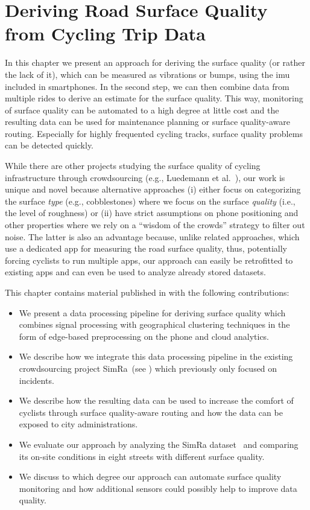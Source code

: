 \chapter{Deriving Road Surface Quality from Cycling Trip Data}
\label{cha:cyclequality}
In this chapter we present an approach for deriving the surface quality (or rather the lack of it), which can be measured as vibrations or bumps, using the \ac{imu} included in smartphones.
In the second step, we can then combine data from multiple rides to derive an estimate for the surface quality.
This way, monitoring of surface quality can be automated to a high degree at little cost and the resulting data can be used for maintenance planning or surface quality-aware routing.
Especially for highly frequented cycling tracks, surface quality problems can be detected quickly.

While there are other projects studying the surface quality of cycling infrastructure through crowdsourcing (e.g., Luedemann et al.~\cite{luedemann2022bikevibes}), our work is unique and novel because alternative approaches (i) either focus on categorizing the surface \emph{type} (e.g., cobblestones) where we focus on the surface \emph{quality} (i.e., the level of roughness) or (ii) have strict assumptions on phone positioning and other properties where we rely on a ``wisdom of the crowds'' strategy to filter out noise.
The latter is also an advantage because, unlike related approaches, which use a dedicated app for measuring the road surface quality, thus, potentially forcing cyclists to run multiple apps, our approach can easily be retrofitted to existing apps and can even be used to analyze already stored datasets.

This chapter contains material published in \cite{karakaya2023crowdsensing} with the following contributions:
\begin{itemize}
	\item We present a data processing pipeline for deriving surface quality which combines signal processing with geographical clustering techniques in the form of edge-based preprocessing on the phone and cloud analytics.
	\item We describe how we integrate this data processing pipeline in the existing crowdsourcing project SimRa~\cite{karakaya2020simra}(see ) which previously only focused on incidents.
	\item We describe how the resulting data can be used to increase the comfort of cyclists through surface quality-aware routing and how the data can be exposed to city administrations.
	\item We evaluate our approach by analyzing the SimRa dataset~\cite{dataset_simra_set1,dataset_simra_set2,dataset_simra_set3} and comparing its on-site conditions in eight streets with different surface quality.
	\item We discuss to which degree our approach can automate surface quality monitoring and how additional sensors could possibly help to improve data quality.
\end{itemize}

